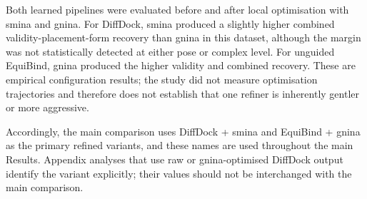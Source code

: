 Both learned pipelines were evaluated before and after local optimisation with smina and gnina. For DiffDock, smina produced a slightly higher combined validity-placement-form recovery than gnina in this dataset, although the margin was not statistically detected at either pose or complex level. For unguided EquiBind, gnina produced the higher validity and combined recovery. These are empirical configuration results; the study did not measure optimisation trajectories and therefore does not establish that one refiner is inherently gentler or more aggressive.

Accordingly, the main comparison uses DiffDock + smina and EquiBind + gnina as the primary refined variants, and these names are used throughout the main Results. Appendix analyses that use raw or gnina-optimised DiffDock output identify the variant explicitly; their values should not be interchanged with the main comparison.


